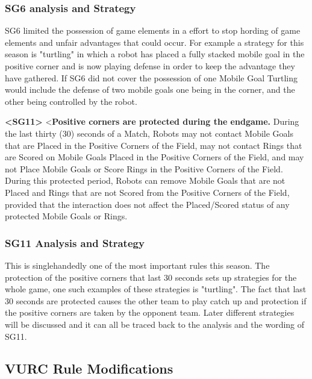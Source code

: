 \subsubsection{SG6 analysis and Strategy}

SG6 limited the possession of game elements in a effort to stop hording of game elements and unfair advantages that could occur.  For example a strategy for this season is "turtling" in which a robot has placed a fully stacked mobile goal in the positive corner and is now playing defense in order to keep the advantage they have gathered. If SG6 did not cover the possession of one Mobile Goal Turtling would include the defense of two mobile goals one being in the corner, and the other being controlled by the robot. 
\newline

 \textbf{<SG11>} <\textbf{Positive corners are protected during the endgame.} During the last thirty (30) seconds of a Match, Robots may not contact Mobile Goals that are Placed in the Positive Corners of the Field, may not contact Rings that are Scored on Mobile Goals Placed in the Positive Corners of the Field, and may not Place Mobile Goals or Score Rings in the Positive Corners of the Field. During this protected period, Robots can remove Mobile Goals that are not Placed and Rings that are not Scored from the Positive Corners of the Field, provided that the interaction does not affect the Placed/Scored status of any protected Mobile Goals or Rings. 
\newline

\subsubsection{SG11 Analysis and Strategy}

 This is singlehandedly one of the most important rules this season. The protection of the positive corners that last 30 seconds sets up strategies for the whole game, one such examples of these strategies is "turtling". The fact that last 30 seconds are protected causes the other team to play catch up and protection if the positive corners are taken by the opponent team.  Later different strategies will be discussed and it can all be traced back to the analysis and the wording of SG11. 
\newline




\subsection{VURC Rule Modifications}


